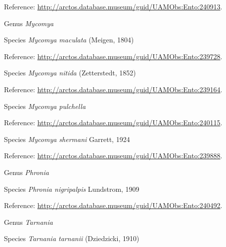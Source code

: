 \documentclass[9pt, article]{memoir}
\begin{document}
\begin{multicols}{2}
\vspace{6pt}Reference: 
\url{http://arctos.database.museum/guid/UAMObs:Ento:240913}.

\vspace{6pt}\noindent\hspace{30pt}Genus \textit{Mycomya}


\vspace{6pt}\noindent\hspace{36pt}Species \textit{Mycomya maculata} (Meigen, 1804)


\vspace{6pt}Reference: 
\url{http://arctos.database.museum/guid/UAMObs:Ento:239728}.

\vspace{6pt}\noindent\hspace{36pt}Species \textit{Mycomya nitida} (Zetterstedt, 1852)


\vspace{6pt}Reference: 
\url{http://arctos.database.museum/guid/UAMObs:Ento:239164}.

\vspace{6pt}\noindent\hspace{36pt}Species \textit{Mycomya pulchella}


\vspace{6pt}Reference: 
\url{http://arctos.database.museum/guid/UAMObs:Ento:240115}.

\vspace{6pt}\noindent\hspace{36pt}Species \textit{Mycomya shermani} Garrett, 1924


\vspace{6pt}Reference: 
\url{http://arctos.database.museum/guid/UAMObs:Ento:239888}.

\vspace{6pt}\noindent\hspace{30pt}Genus \textit{Phronia}


\vspace{6pt}\noindent\hspace{36pt}Species \textit{Phronia nigripalpis} Lundstrom, 1909


\vspace{6pt}Reference: 
\url{http://arctos.database.museum/guid/UAMObs:Ento:240492}.

\vspace{6pt}\noindent\hspace{30pt}Genus \textit{Tarnania}


\vspace{6pt}\noindent\hspace{36pt}Species \textit{Tarnania tarnanii} (Dziedzicki, 1910)



\end{multicols}
\end{document}
